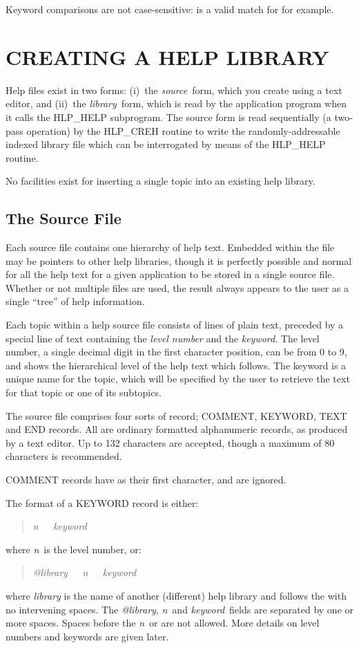Keyword comparisons are not case-sensitive:  is a valid match for
 for example.

\section{CREATING A HELP LIBRARY}
Help files exist in two forms: (i)~the {\it source}\, form, which you
create using a text editor, and (ii)~the {\it library}\, form, which
is read by the application program when it
calls the HLP\_HELP subprogram.  The source form is read
sequentially (a two-pass operation) by the HLP\_CREH routine
to write the randomly-addressable indexed library file which
can be interrogated by means of the HLP\_HELP routine.

No facilities exist for inserting a single topic into an existing
help library.

\subsection{The Source File}
Each source file contains one hierarchy of help text.  Embedded
within the file may be pointers to other help libraries, though
it is perfectly possible and normal for all the help text for a given
application to be stored in a single source file.  Whether or not
multiple files are used, the result always appears to the user as a
single ``tree'' of help information.

Each topic within a help source file consists of lines of plain
text, preceded by a special line of text containing the {\it level
number} and the {\it keyword}.  The level number, a single decimal
digit in the first character position, can be from 0 to 9, and shows
the hierarchical level of the help text which follows.  The keyword
is a unique name for the topic, which will be specified by the
user to retrieve the text for that topic or one of its subtopics.

The source file comprises four sorts of record;  COMMENT, KEYWORD,
TEXT and END records.  All are ordinary formatted alphanumeric
records, as produced by a text editor.  Up to 132 characters
are accepted, though a maximum of 80 characters is recommended.

COMMENT records have \fstring{!} as their first character, and are ignored.

The format of a KEYWORD record is either:
\begin{verse}
{\it n~~~keyword}
\end{verse}
where {\it n}\, is the level number, or:
\begin{verse}
{\it @library~~~n~~~keyword}
\end{verse}
where {\it library} is the name of another (different) help library and
follows the  with no intervening spaces.  The {\it @library},
{\it n}\, and {\it keyword}\, fields are separated by one or more spaces.
Spaces before the {\it n}\, or  are
not allowed.  More details on level numbers and keywords are
given later.

